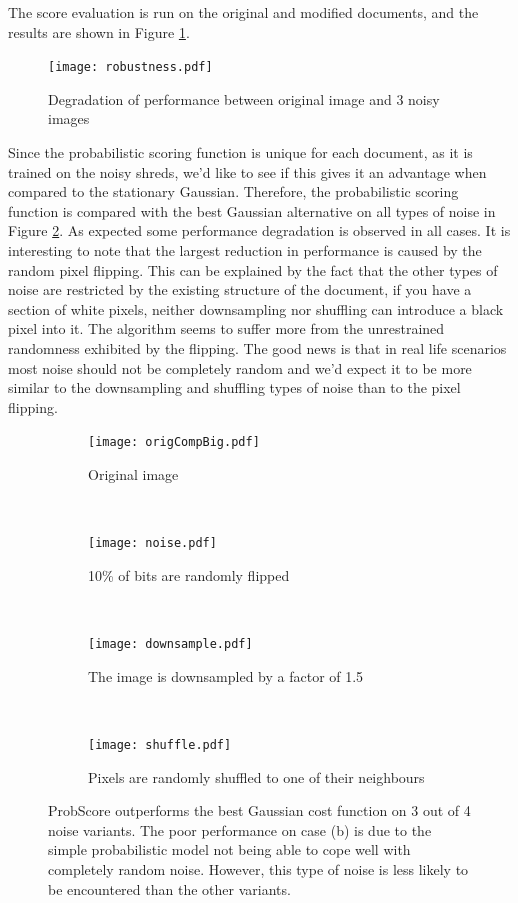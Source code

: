 The score evaluation is run on the original and modified documents, and the results are shown in Figure \ref{fig:robustness}. 

\begin{figure}[H]
\centering
\texttt{[image: robustness.pdf]}
\caption{Degradation of performance between original image and 3 noisy images}
\label{fig:robustness}
\end{figure}

Since the probabilistic scoring function is unique for each document, as it is trained on the noisy shreds, we'd like to see if this gives it an advantage when compared to the stationary Gaussian. Therefore, the probabilistic scoring function is compared with the best Gaussian alternative on all types of noise in Figure \ref{fig:robComp}. As expected some performance degradation is observed in all cases. It is interesting to note that the largest reduction in performance is caused by the random pixel flipping. This can be explained by the fact that the other types of noise are restricted by the existing structure of the document, if you have a section of white pixels, neither downsampling nor shuffling can introduce a black pixel into it. The algorithm seems to suffer more from the unrestrained randomness exhibited by the flipping. The good news is that in real life scenarios most noise should not be completely random and we'd expect it to be more similar to the downsampling and shuffling types of noise than to the pixel flipping.

\begin{figure}[h]
        \centering
        \begin{subfigure}[b]{0.49\textwidth}
                \centering
                \texttt{[image: origCompBig.pdf]}
                \caption{Original image}
        \end{subfigure}
        ~ 
        \begin{subfigure}[b]{0.49\textwidth}
                \centering
                \texttt{[image: noise.pdf]}
                \caption{10\% of bits are randomly flipped}
        \end{subfigure}
        ~ 
        \begin{subfigure}[b]{0.49\textwidth}
                \centering
                \texttt{[image: downsample.pdf]}
                \caption{The image is downsampled by a factor of 1.5}
        \end{subfigure}
        ~ 
        \begin{subfigure}[b]{0.49\textwidth}
                \centering
                \texttt{[image: shuffle.pdf]}
                \caption{Pixels are randomly shuffled to one of their neighbours}
        \end{subfigure}
        \caption{ProbScore outperforms the best Gaussian cost function on 3 out of 4 noise variants. The poor performance on case (b) is due to the simple probabilistic model not being able to cope well with completely random noise. However, this type of noise is less likely to be encountered than the other variants.}
        \label{fig:robComp}
\end{figure}

